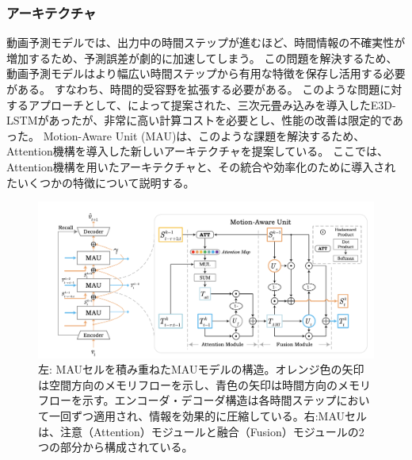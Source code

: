       \subsubsection{アーキテクチャ}
      動画予測モデルでは、出力中の時間ステップが進むほど、時間情報の不確実性が増加するため、予測誤差が劇的に加速してしまう。
      この問題を解決するため、動画予測モデルはより幅広い時間ステップから有用な特徴を保存し活用する必要がある。
      すなわち、時間的受容野を拡張する必要がある。
      このような問題に対するアプローチとして、によって提案された、三次元畳み込みを導入したE3D-LSTMがあったが、非常に高い計算コストを必要とし、性能の改善は限定的であった。
      Motion-Aware Unit (MAU)は、このような課題を解決するため、Attention機構を導入した新しいアーキテクチャを提案している。
      ここでは、Attention機構を用いたアーキテクチャと、その統合や効率化のために導入されたいくつかの特徴について説明する。
      \begin{figure}[htbp]
        \begin{center}
          \includegraphics[width=160mm]{figures/videoprediction/mau.png}
          \caption{左: MAUセルを積み重ねたMAUモデルの構造。オレンジ色の矢印は空間方向のメモリフローを示し、青色の矢印は時間方向のメモリフローを示す。エンコーダ・デコーダ構造は各時間ステップにおいて一回ずつ適用され、情報を効果的に圧縮している。右:MAUセルは、注意（Attention）モジュールと融合（Fusion）モジュールの2つの部分から構成されている。}
          \label{fig:mau_attention}
        \end{center}
      \end{figure}
        
